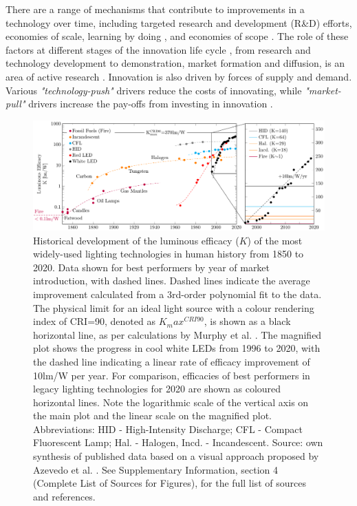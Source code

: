 \documentclass[twoside,twocolumn,9pt]{article}
\begin{document}
There are a range of mechanisms that contribute to improvements in a technology over time, including targeted research and development (R\&D) efforts, economies of scale, learning by doing \cite{Arrow1971}, and economies of scope \cite{johansson2012global}\cite{national2016power}\cite{iea2020perspectives}. The role of these factors at different stages of the innovation life cycle \cite{ grubler2012policies}, from research and technology development to demonstration, market formation and diffusion, is an area of active research \cite{Mowery1979} \cite{kavlak2018evaluating} \cite{Ziegler2021}. Innovation is also driven by forces of supply and demand. Various \textit{"technology-push"} drivers reduce the costs of innovating, while \textit{"market-pull"} drivers increase the pay-offs from investing in innovation \cite{anadon2009policy}.

\begin{figure}[h]
 \centering
 \includegraphics[width=\textwidth]{2_SSL_EES/article/figures/history_efficacy.pdf}
 \caption{Historical development of the luminous efficacy ($K$) of the most widely-used lighting technologies in human history from 1850 to 2020. Data shown for best performers by year of market introduction, with dashed lines. Dashed lines indicate the average improvement calculated from a 3rd-order polynomial fit to the data. The physical limit for an ideal light source with a colour rendering index of CRI=90, denoted as $K_max^{CRI90}$, is shown as a black horizontal line, as per calculations by Murphy et al. \cite{Murphy2012}. The magnified plot shows the progress in cool white LEDs from 1996 to 2020, with the dashed line indicating a linear rate of efficacy improvement of 10lm/W per year. For comparison, efficacies of best performers in legacy lighting technologies for 2020 are shown as coloured horizontal lines. Note the logarithmic scale of the vertical axis on the main plot and the linear scale on the magnified plot. Abbreviations: HID - High-Intensity Discharge; CFL - Compact Fluorescent Lamp; Hal. - Halogen, Incd. - Incandescent. Source: own synthesis of published data based on a visual approach proposed by Azevedo et al. \cite{azevedo2009transition}. See Supplementary Information, section 4 (Complete List of Sources for Figures), for the full list of sources and references.}
 \label{fgr:history_efficacy}
\end{figure}
 
\end{document}
